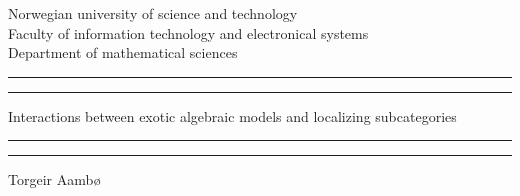 
\begin{titlingpage}



    \vspace*{5cm}
    \begin{center}
	Norwegian university of science and 		technology \\
	Faculty of information technology and 		electronical systems \\
	Department of mathematical sciences 
	\end{center}
    \rule[-11pt]{\textwidth}{1pt}
    \rule{\textwidth}{0.5pt}

    \begin{center}
    \Huge Interactions between exotic algebraic models and localizing subcategories
    \end{center}

    \rule{\textwidth}{0.5pt}
    \rule[10.1pt]{\textwidth}{1pt}


    \begin{center}
    Torgeir Aambø
    \end{center}



    \vspace{\fill}



\end{titlingpage}